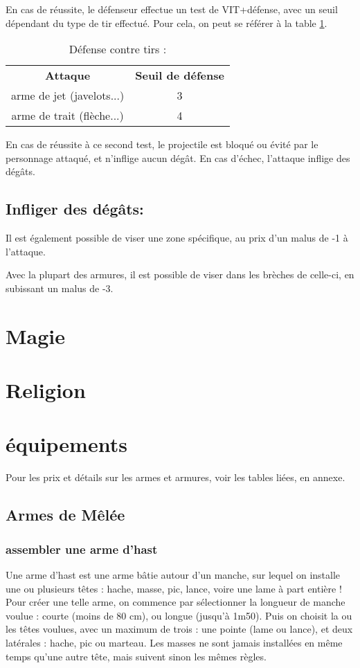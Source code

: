\documentclass[10pt,a4paper,twocolumn]{book}
\begin{document}
En cas de réussite, le défenseur effectue un test de VIT+défense, avec un seuil dépendant du type de tir effectué. Pour cela, on peut se référer à la table \ref{tableDiffContreTirs}.

\begin{table}
\caption{ Défense contre tirs :}
\label{tableDiffContreTirs}
\begin{center}
\begin{tabular}{cc}
\textbf{Attaque} & \textbf{Seuil de défense} \\
   arme de jet (javelots...) & 3\\
   arme de trait (flèche...) & 4\\
\end{tabular}
\end{center}
\end{table}
En cas de réussite à ce second test, le projectile est bloqué ou évité par le personnage attaqué, et n’inflige aucun dégât. 
En cas d’échec, l’attaque inflige des dégâts.
\subsection{Infliger des dégâts:}


Il est également possible de viser une zone spécifique, au prix d’un malus de -1 à l’attaque.

Avec la plupart des armures, il est possible de viser dans les brèches de celle-ci, en subissant un malus de -3.

\section{Magie}
\section{Religion}
\section{équipements}
Pour les prix et détails sur les armes et armures, voir les tables liées, en annexe.
\subsection{Armes de Mêlée}
\subsubsection{assembler une arme d’hast}
Une arme d’hast est une arme bâtie autour d’un manche, sur lequel on installe une ou plusieurs têtes : hache, masse, pic, lance, voire une lame à part entière ! Pour créer une telle arme, on commence par sélectionner la longueur de manche voulue : courte (moins de 80 cm), ou longue (jusqu’à 1m50). Puis on choisit la ou les têtes voulues, avec un maximum de trois : une pointe (lame ou lance), et deux latérales : hache, pic ou marteau. Les masses ne sont jamais installées en même temps qu’une autre tête, mais suivent sinon les mêmes règles.
\end{document}

